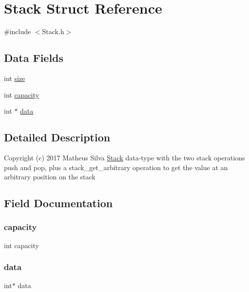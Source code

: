 \hypertarget{struct_stack}{}\section{Stack Struct Reference}
\label{struct_stack}


{\ttfamily \#include $<$Stack.\+h$>$}

\subsection*{Data Fields}
\begin{DoxyCompactItemize}
\item 
int \hyperlink{struct_stack_a439227feff9d7f55384e8780cfc2eb82}{size}
\item 
int \hyperlink{struct_stack_adbe66a087ac3fd4a5b0566f64ca2d12b}{capacity}
\item 
int $\ast$ \hyperlink{struct_stack_ac103627c1ad15cbec2f22d0abe6d54b6}{data}
\end{DoxyCompactItemize}


\subsection{Detailed Description}
Copyright (c) 2017 Matheus Silva \hyperlink{struct_stack}{Stack} data-\/type with the two stack operations push and pop, plus a stack\+\_\+get\+\_\+arbitrary operation to get the value at an arbitrary position on the stack 

\subsection{Field Documentation}
\mbox{\label{struct_stack_adbe66a087ac3fd4a5b0566f64ca2d12b}} 
\subsubsection{\texorpdfstring{capacity}{capacity}}
{\footnotesize\ttfamily int capacity}

\mbox{\label{struct_stack_ac103627c1ad15cbec2f22d0abe6d54b6}} 
\subsubsection{\texorpdfstring{data}{data}}
{\footnotesize\ttfamily int$\ast$ data}

